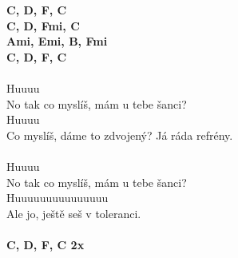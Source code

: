 \begin{multicols}{2}
\color{black}
\footnotesize\textbf{C, D\7, F, C\\
C, D\7, Fmi, C\\
Ami, Emi, B\be, Fmi\\
C, D\7, F, C}\\
\\
\normalsize
Huuuu\\
No tak co myslíš, mám u tebe šanci?\\
Huuuu\\
\color{blue}
Co myslíš, dáme to zdvojený? \color{red} Já ráda refrény.\\
\\
\color{black}
Huuuu\\
No tak co myslíš, mám u tebe šanci?\\
Huuuuuuuuuuuuuuu\\
Ale jo, ještě seš v toleranci.\\ 
\\
\footnotesize\textbf{C, D\7, F, C 2x}\\
\normalsize
\end{multicols}